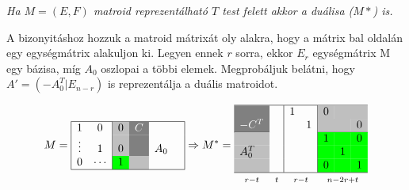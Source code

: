 \emph{Ha $M=(E,F)$ matroid reprezentálható $T$ test felett akkor a duálisa ($M*$) is.}

A bizonyitáshoz hozzuk a matroid mátrixát oly alakra, hogy a mátrix bal oldalán
egy egységmátrix alakuljon ki. Legyen ennek $r$ sorra, ekkor $E_r$ egységmátrix
M egy bázisa, míg $A_0$ oszlopai a többi elemek. Megprobáljuk belátni, hogy $A'=(-A_0^T|E_{n-r})$
is reprezentálja a duális matroidot.

\[ 
M=
\begin{array}{|cc|c|c|rc|}
\hline
1       &  0     & \multicolumn{1}{>{\columncolor{lightgray}}l}{\color{black}0} & \multicolumn{1}{>{\columncolor{gray}}l}{\color{white}C} &     &\\
\vdots &  1     & \multicolumn{1}{>{\columncolor{lightgray}}l}{\color{black}0} &  \multicolumn{1}{>{\columncolor{gray}}l}{\color{white}} & A_0 &\\
0       &  \cdots  & \multicolumn{1}{>{\columncolor{green}}l}{\color{black}1} &\multicolumn{1}{>{\columncolor{lightgray}}l}{\color{black}}   &     &\\
\hline
\end{array}
\Rightarrow
M^*=
\begin{array}{|c|c|cc|lcr|}
\hline
\multicolumn{1}{>{\columncolor{gray}}l}{\color{white}}        & & 1&  &\multicolumn{1}{>{\columncolor{lightgray}}l}{\color{black}0} & \multicolumn{2}{>{\columncolor{lightgray}}l}{\color{black}}  \\
\multicolumn{1}{>{\columncolor{gray}}l}{\color{white}-C^T}    & &  & 1&\multicolumn{2}{>{\columncolor{lightgray}}l}{\color{black}} &\multicolumn{1}{>{\columncolor{lightgray}}l}{\color{black}0}  \\
\cline{1-1} \cline{5-7}
\multicolumn{1}{>{\columncolor{lightgray}}l}{\color{black}}   & &  &  & \multicolumn{1}{>{\columncolor{green}}l}{\color{black}1} & \multicolumn{1}{>{\columncolor{green}}l}{\color{black}} &\multicolumn{1}{>{\columncolor{green}}l}{\color{black}0}  \\
\multicolumn{1}{>{\columncolor{lightgray}}l}{\color{black}A_0^T}     & &  && \multicolumn{1}{>{\columncolor{green}}l}{\color{black}}  & \multicolumn{1}{>{\columncolor{green}}l}{\color{black}1}   & \multicolumn{1}{>{\columncolor{green}}l}{\color{black}} \\
\multicolumn{1}{>{\columncolor{lightgray}}l}{\color{black}} & &  &  & \multicolumn{1}{>{\columncolor{green}}l}{\color{black}0}  & \multicolumn{1}{>{\columncolor{green}}l}{\color{black}}  & \multicolumn{1}{>{\columncolor{green}}l}{\color{black}1} \\ \hline
\multicolumn{1}{c}{\mathsmaller{r-t}} & \multicolumn{1}{c}{\mathsmaller{t}} & \multicolumn{2}{c}{\mathsmaller{r-t}} & \multicolumn{3}{c}{\mathsmaller{n-2r+t}}
\end{array} 
\]

